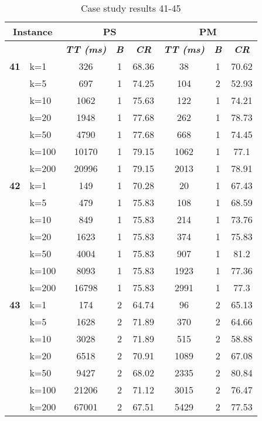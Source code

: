     \begin{table}[htbp]
    \caption{Case study results 41-45}
    \centering
    \begin{tabular}{|l|l|c|c|c|c|c|c|}
    \hline
    \multicolumn{ 2}{|c|}{\textbf{Instance}} & \multicolumn{ 3}{c|}{\textbf{PS}} & \multicolumn{ 3}{c|}{\textbf{PM}} \\ \hline
    \multicolumn{ 2}{|l|}{} & \textbf{\textit{TT (ms)}} & \textbf{\textit{B}} & \textbf{\textit{CR}} & \textbf{\textit{TT (ms)}} & \textbf{\textit{B}} & \textbf{\textit{CR}} \\ \hline
    \multicolumn{1}{|r|}{\textbf{41}} & k=1 & 326 & 1 & 68.36 & 38 & 1 & 70.62 \\ 
     & k=5 & 697 & 1 & 74.25 & 104 & 2 & 52.93 \\ 
     & k=10 & 1062 & 1 & 75.63 & 122 & 1 & 74.21 \\ 
     & k=20 & 1948 & 1 & 77.68 & 262 & 1 & 78.73 \\ 
     & k=50 & 4790 & 1 & 77.68 & 668 & 1 & 74.45 \\ 
     & k=100 & 10170 & 1 & 79.15 & 1062 & 1 & 77.1 \\ 
     & k=200 & 20996 & 1 & 79.15 & 2013 & 1 & 78.91 \\ \hline
    \multicolumn{1}{|r|}{\textbf{42}} & k=1 & 149 & 1 & 70.28 & 20 & 1 & 67.43 \\ 
     & k=5 & 479 & 1 & 75.83 & 108 & 1 & 68.59 \\ 
     & k=10 & 849 & 1 & 75.83 & 214 & 1 & 73.76 \\ 
     & k=20 & 1623 & 1 & 75.83 & 374 & 1 & 75.83 \\ 
     & k=50 & 4004 & 1 & 75.83 & 907 & 1 & 81.2 \\ 
     & k=100 & 8093 & 1 & 75.83 & 1923 & 1 & 77.36 \\ 
     & k=200 & 16798 & 1 & 75.83 & 2991 & 1 & 77.3 \\ \hline
    \multicolumn{1}{|r|}{\textbf{43}} & k=1 & 174 & 2 & 64.74 & 96 & 2 & 65.13 \\ 
     & k=5 & 1628 & 2 & 71.89 & 370 & 2 & 64.66 \\ 
     & k=10 & 3028 & 2 & 71.89 & 515 & 2 & 58.88 \\ 
     & k=20 & 6518 & 2 & 70.91 & 1089 & 2 & 67.08 \\ 
     & k=50 & 9427 & 2 & 68.02 & 2335 & 2 & 80.84 \\ 
     & k=100 & 21206 & 2 & 71.12 & 3015 & 2 & 76.47 \\ 
     & k=200 & 67001 & 2 & 67.51 & 5429 & 2 & 77.53 \\ \hline

\end{tabular}
\end{table}
